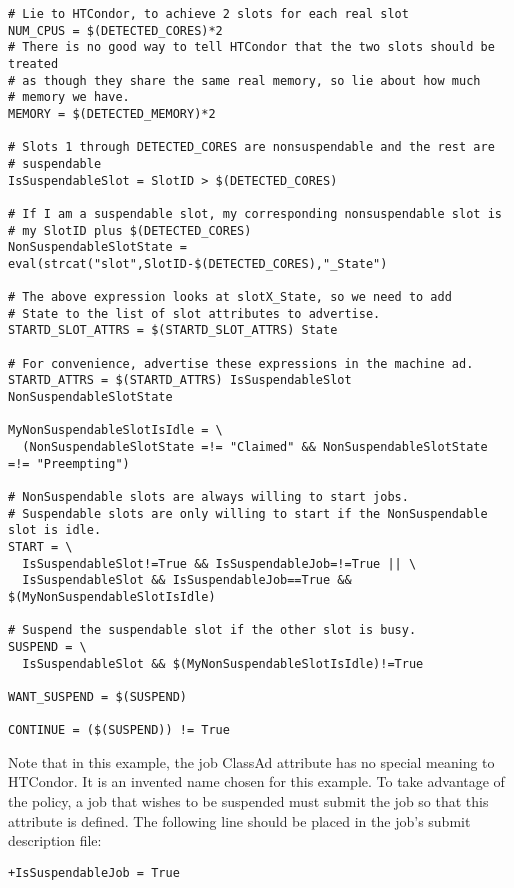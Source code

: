 \footnotesize
\begin{verbatim}
# Lie to HTCondor, to achieve 2 slots for each real slot
NUM_CPUS = $(DETECTED_CORES)*2
# There is no good way to tell HTCondor that the two slots should be treated
# as though they share the same real memory, so lie about how much
# memory we have.
MEMORY = $(DETECTED_MEMORY)*2

# Slots 1 through DETECTED_CORES are nonsuspendable and the rest are
# suspendable
IsSuspendableSlot = SlotID > $(DETECTED_CORES)

# If I am a suspendable slot, my corresponding nonsuspendable slot is
# my SlotID plus $(DETECTED_CORES)
NonSuspendableSlotState = eval(strcat("slot",SlotID-$(DETECTED_CORES),"_State")

# The above expression looks at slotX_State, so we need to add
# State to the list of slot attributes to advertise.
STARTD_SLOT_ATTRS = $(STARTD_SLOT_ATTRS) State

# For convenience, advertise these expressions in the machine ad.
STARTD_ATTRS = $(STARTD_ATTRS) IsSuspendableSlot NonSuspendableSlotState

MyNonSuspendableSlotIsIdle = \
  (NonSuspendableSlotState =!= "Claimed" && NonSuspendableSlotState =!= "Preempting")

# NonSuspendable slots are always willing to start jobs.
# Suspendable slots are only willing to start if the NonSuspendable slot is idle.
START = \
  IsSuspendableSlot!=True && IsSuspendableJob=!=True || \
  IsSuspendableSlot && IsSuspendableJob==True && $(MyNonSuspendableSlotIsIdle)

# Suspend the suspendable slot if the other slot is busy.
SUSPEND = \
  IsSuspendableSlot && $(MyNonSuspendableSlotIsIdle)!=True

WANT_SUSPEND = $(SUSPEND)

CONTINUE = ($(SUSPEND)) != True

\end{verbatim}
\normalsize

Note that in this example, the job ClassAd attribute 
has no special meaning to HTCondor.  It is an invented name chosen
for this example.
To take advantage of the policy, a job that wishes to be suspended
must submit the job so that this attribute is defined.
The following line should be placed in the job's submit description file:
\begin{verbatim}
+IsSuspendableJob = True
\end{verbatim}



